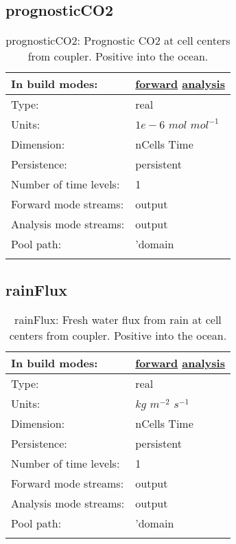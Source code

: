 \subsection[prognosticCO2]{prognosticCO2}
\label{subsec:var_sec_forcing_prognosticCO2}
\begin{center}
\begin{longtable}{| p{2.0in} | p{4.0in} |}
        \hline 
        In build modes: & \hyperref[subsec:forward_var_tab_forcing]{forward} \hyperref[subsec:analysis_var_tab_forcing]{analysis} \\
        \hline 
        Type: & real \\
        \hline 
        Units: & $1e-6$ $mol$ $mol^{-1}$ \\
        \hline 
        Dimension: & nCells Time \\
        \hline 
        Persistence: & persistent \\
        \hline 
        Number of time levels: & 1 \\
        \hline 
		 Forward mode streams: &  output \\
        \hline 
		 Analysis mode streams: &  output \\
        \hline 
            Pool path: & 'domain %
 \\
		 \hline 
    \caption{prognosticCO2: Prognostic CO2 at cell centers from coupler. Positive into the ocean.}
\end{longtable}
\end{center}
\subsection[rainFlux]{rainFlux}
\label{subsec:var_sec_forcing_rainFlux}
\begin{center}
\begin{longtable}{| p{2.0in} | p{4.0in} |}
        \hline 
        In build modes: & \hyperref[subsec:forward_var_tab_forcing]{forward} \hyperref[subsec:analysis_var_tab_forcing]{analysis} \\
        \hline 
        Type: & real \\
        \hline 
        Units: & $kg$ $m^{-2}$ $s^{-1}$ \\
        \hline 
        Dimension: & nCells Time \\
        \hline 
        Persistence: & persistent \\
        \hline 
        Number of time levels: & 1 \\
        \hline 
		 Forward mode streams: &  output \\
        \hline 
		 Analysis mode streams: &  output \\
        \hline 
            Pool path: & 'domain %
 \\
		 \hline 
    \caption{rainFlux: Fresh water flux from rain at cell centers from coupler. Positive into the ocean.}
\end{longtable}
\end{center}
